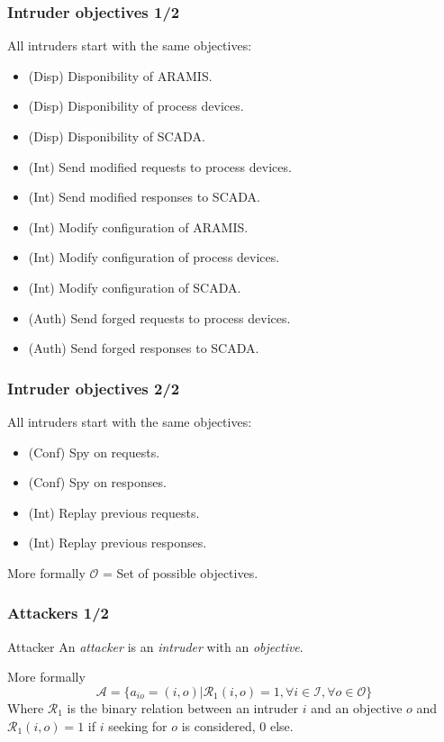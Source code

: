 \documentclass{beamer}
\begin{document}
\begin{frame}
    \frametitle{Intruder objectives 1/2}

    All intruders start with the same objectives:
    \begin{itemize}
        \item (Disp) Disponibility of ARAMIS.
        \item (Disp) Disponibility of process devices.
        \item (Disp) Disponibility of SCADA.
        \item (Int) Send modified requests to process devices.
        \item (Int) Send modified responses to SCADA.
        \item (Int) Modify configuration of ARAMIS.
        \item (Int) Modify configuration of process devices.
        \item (Int) Modify configuration of SCADA.
        \item (Auth) Send forged requests to process devices.
        \item (Auth) Send forged responses to SCADA.
    \end{itemize}
\end{frame}

\begin{frame}
    \frametitle{Intruder objectives 2/2}

    All intruders start with the same objectives:
    \begin{itemize}
        \item (Conf) Spy on requests.
        \item (Conf) Spy on responses.
        \item (Int) Replay previous requests.
        \item (Int) Replay previous responses.
    \end{itemize}
    \vfill
    \begin{block}{More formally}
        $\mathcal{O}$ = Set of possible objectives.
    \end{block}
\end{frame}

\begin{frame}
    \frametitle{Attackers 1/2}
    
    \begin{block}{Attacker}
        An {\em attacker} is an {\em intruder} with an {\em objective}.
    \end{block}
    \vfill
    \begin{block}{More formally}
        $$\mathcal{A} = \{a_{io} = (i,o) | \mathcal{R}_{1}(i,o) = 1, \forall i \in \mathcal{I}, \forall o \in \mathcal{O}\}$$
        Where $\mathcal{R}_{1}$ is the binary relation between an intruder $i$ and an objective $o$ and
        $\mathcal{R}_{1}(i,o) = 1$ if $i$ seeking for $o$ is considered, $0$ else.
    \end{block}
\end{frame}
\end{document}
